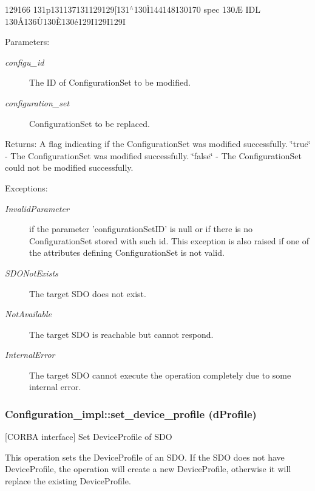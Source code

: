 129166 131p131137131129129[131$^\wedge$130\`{I}144148130170 spec 130\AE{} IDL 130\AA{}136\`{U}130\`{E}130\'{e}129I129I129I \begin{Desc}
\item[Parameters:]
\begin{description}
\item[{\em configu\_\-id}]The ID of Configuration\-Set to be modified. \item[{\em configuration\_\-set}]Configuration\-Set to be replaced. \end{description}
\end{Desc}
\begin{Desc}
\item[Returns:]A flag indicating if the Configuration\-Set was modified successfully. \char`\"{}true\char`\"{} - The Configuration\-Set was modified successfully. \char`\"{}false\char`\"{} - The Configuration\-Set could not be modified successfully. \end{Desc}
\begin{Desc}
\item[Exceptions:]
\begin{description}
\item[{\em Invalid\-Parameter}]if the parameter 'configuration\-Set\-ID' is null or if there is no Configuration\-Set stored with such id. This exception is also raised if one of the attributes defining Configuration\-Set is not valid. \item[{\em SDONot\-Exists}]The target SDO does not exist. \item[{\em Not\-Available}]The target SDO is reachable but cannot respond. \item[{\em Internal\-Error}]The target SDO cannot execute the operation completely due to some internal error.\end{description}
\end{Desc}
\subsubsection{\setlength{\rightskip}{0pt plus 5cm}Configuration\_\-impl::set\_\-device\_\-profile (d\-Profile)}\label{classConfiguration__impl_Configuration__impla1}


[CORBA interface] Set Device\-Profile of SDO 

This operation sets the Device\-Profile of an SDO. If the SDO does not have Device\-Profile, the operation will create a new Device\-Profile, otherwise it will replace the existing Device\-Profile.

